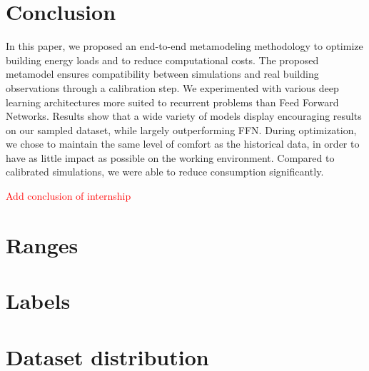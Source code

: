 \documentclass[12pt]{article}
\begin{document}
\section{Conclusion}
In this paper, we proposed an end-to-end metamodeling methodology to optimize building energy loads and to reduce computational costs. The proposed metamodel ensures compatibility between simulations and real building observations through a calibration step. We experimented with various deep learning architectures more suited to recurrent problems than Feed Forward Networks. Results show that a wide variety of models display encouraging results on our sampled dataset, while largely outperforming FFN. During optimization, we chose to maintain the same level of comfort as the historical data, in order to have as little impact as possible on the working environment. Compared to calibrated simulations, we were able to reduce consumption significantly.

\textcolor{red}{Add conclusion of internship}



\clearpage
\appendix

\section{Ranges}


\section{Labels}


\section{Dataset distribution}

\end{document}
